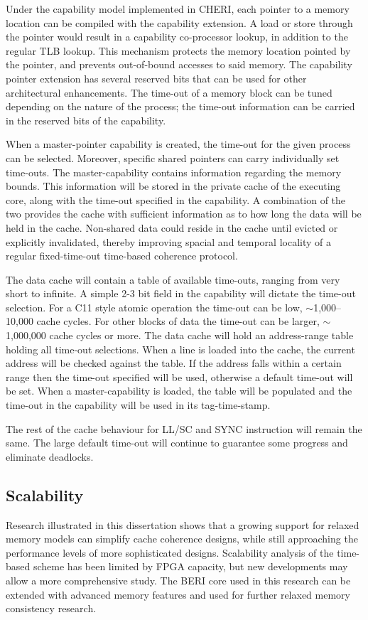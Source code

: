 			Under the capability model implemented in CHERI, each pointer to a memory location can be compiled with the capability extension. A load or store through the pointer would result in a capability co-processor lookup, in addition to the regular TLB lookup. This mechanism protects the memory location pointed by the pointer, and prevents out-of-bound accesses to said memory. The capability pointer extension has several reserved bits that can be used for other architectural enhancements. The time-out of a memory block can be tuned depending on the nature of the process; the time-out information can be carried in the reserved bits of the capability.
			
			When a master-pointer capability is created, the time-out for the given process can be selected. Moreover, specific shared pointers can carry individually set time-outs. The master-capability contains information regarding the memory bounds. This information will be stored in the private cache of the executing core, along with the time-out specified in the capability. A combination of the two provides the cache with sufficient information as to how long the data will be held in the cache. Non-shared data could reside in the cache until evicted or explicitly invalidated, thereby improving spacial and temporal locality of a regular fixed-time-out time-based coherence protocol. 
			
			The data cache will contain a table of available time-outs, ranging from very short to infinite. A simple 2-3 bit field in the capability will dictate the time-out selection. For a C11 style atomic operation the time-out can be low, $\sim$1,000--10,000 cache cycles. For other blocks of data the time-out can be larger, $\sim$1,000,000 cache cycles or more. The data cache will hold an address-range table holding all time-out selections. When a line is loaded into the cache, the current address will be checked against the table. If the address falls within a certain range then the time-out specified will be used, otherwise a default time-out will be set. When a master-capability is loaded, the table will be populated and the time-out in the capability will be used in its tag-time-stamp. 
			
			The rest of the cache behaviour for LL/SC and SYNC instruction will remain the same. The large default time-out will continue to guarantee some progress and eliminate deadlocks.
				
		\subsection{Scalability}
			Research illustrated in this dissertation shows that a growing support for relaxed memory models can simplify cache coherence designs, while still approaching the performance levels of more sophisticated designs. Scalability analysis of the time-based scheme has been limited by FPGA capacity, but new developments may allow a more comprehensive study. The BERI core used in this research can be extended with advanced memory features and used for further relaxed memory consistency research. 
		
